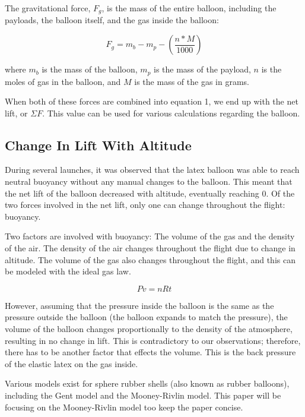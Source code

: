 \documentclass[usaAMS,usenatbib]{mn2e}
\newcommand{\f}[2]{\frac{#1}{#2}}
\begin{document}
The gravitational force, $F_g$, is the mass of the entire balloon, including the payloads, the balloon itself, and the gas inside the balloon:

\begin{equation}
F_{g}=m_b-m_p-(\f{n*M}{1000})
\end{equation}

where $m_b$ is the mass of the balloon, $m_p$ is the mass of the payload, $n$ is the moles of gas in the balloon, and $M$ is the mass of the gas in grams.

When both of these forces are combined into equation 1, we end up with the net lift, or $\Sigma F$. This value can be used for various calculations regarding the balloon. 

\subsection{Change In Lift With Altitude}
\label{sec:backpressure}

During several launches, it was observed that the latex balloon was able to reach neutral buoyancy without any manual changes to the balloon. This meant that the net lift of the balloon decreased with altitude, eventually reaching 0. Of the two forces involved in the net lift, only one can change throughout the flight: buoyancy.

Two factors are involved with buoyancy: The volume of the gas and the density of the air. The density of the air changes throughout the flight due to change in altitude. The volume of the gas also changes throughout the flight, and this can be modeled with the ideal gas law. 

\begin{equation}
Pv=nRt
\end{equation}

However, assuming that the pressure inside the balloon is the same as the pressure outside the balloon (the balloon expands to match the pressure), the volume of the balloon changes proportionally to the density of the atmosphere, resulting in no change in lift. This is contradictory to our observations; therefore, there has to be another factor that effects the volume. This is the back pressure of the elastic latex on the gas inside. 

Various models exist for sphere rubber shells (also known as rubber balloons), including the Gent model and the Mooney-Rivlin model. This paper will be focusing on the Mooney-Rivlin model too keep the paper concise.
\end{document}
